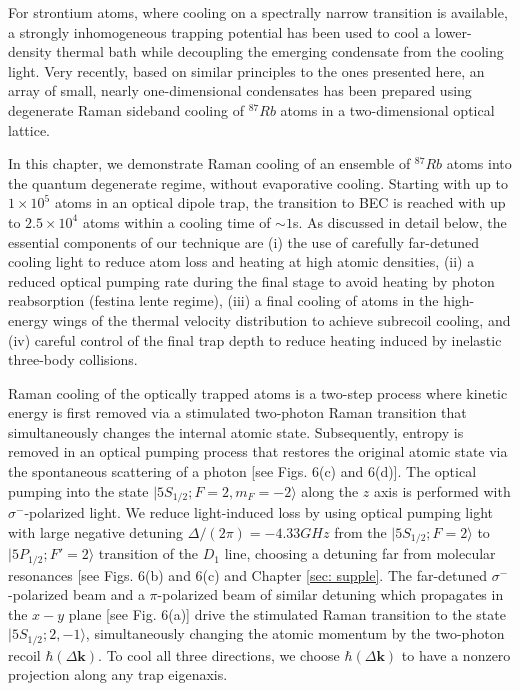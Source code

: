 \documentclass{article}
\begin{document}
For strontium atoms, where cooling on a spectrally narrow transition is available, a strongly inhomogeneous trapping potential has been used to cool a lower-density thermal bath while decoupling the emerging condensate from the cooling light. Very recently, based on similar principles to the ones presented here, an array of small, nearly one-dimensional condensates has been prepared using degenerate Raman sideband cooling of $^{87}Rb$ atoms in a two-dimensional optical lattice.

In this chapter, we demonstrate Raman cooling of an ensemble of $^{87}Rb$ atoms into the quantum degenerate regime, without evaporative cooling. Starting with up to $1 \times 10^5$ atoms in an optical dipole trap, the transition to BEC is reached with up to $2.5 \times 10^4$ atoms within a cooling time of $\sim 1$s. As discussed in detail below, the essential components of our technique are (i) the use of carefully far-detuned cooling light to reduce atom loss and heating at high atomic densities, (ii) a reduced optical pumping rate during the final stage to avoid heating by photon reabsorption (festina lente regime), (iii) a final cooling of atoms in the high-energy wings of the thermal velocity distribution to achieve subrecoil cooling, and (iv) careful control of the final trap depth to reduce heating induced by inelastic three-body collisions.

Raman cooling of the optically trapped atoms is a two-step process where kinetic energy is first removed via a stimulated two-photon Raman transition that simultaneously changes the internal atomic state. Subsequently, entropy is removed in an optical pumping process that restores the original atomic state via the spontaneous scattering of a photon [see Figs. 6(c) and 6(d)]. The optical pumping into the state $\vert 5 S_{1/2}; F = 2, m_F = -2 \rangle$ along the $z$ axis is performed with $\sigma^{-}$-polarized light. We reduce light-induced loss by using optical pumping light with large negative detuning $\Delta / (2\pi) = -4.33 GHz$ from the $\vert 5 S_{1/2}; F = 2 \rangle$ to $\vert 5 P_{1/2}; F'=2 \rangle$ transition of the $D_1$ line, choosing a detuning far from molecular resonances [see Figs. 6(b) and 6(c) and Chapter \ref{sec: supple}. The far-detuned $\sigma^-$-polarized beam and a $\pi$-polarized beam of similar detuning which propagates in the $x-y$ plane [see Fig. 6(a)] drive the stimulated Raman transition to the state $\vert 5 S_{1/2}; 2, -1\rangle$, simultaneously changing the atomic momentum by the two-photon recoil $\hbar (\Delta \mathbf{k})$. To cool all three directions, we choose $\hbar (\Delta \mathbf{k})$ to have a nonzero projection along any trap eigenaxis.
\end{document}
